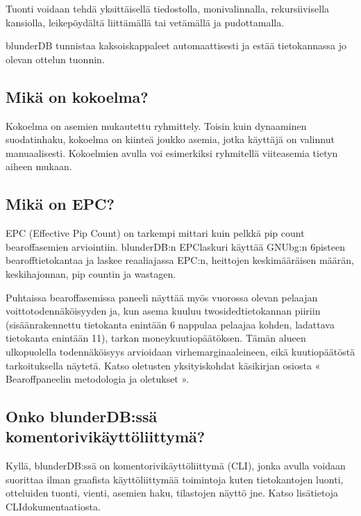 \documentclass[letterpaper,10pt,finnish]{sphinxmanual}
\begin{document}
\sphinxAtStartPar
Tuonti voidaan tehdä yksittäisellä tiedostolla, monivalinnalla, rekursiivisella kansiolla, leikepöydältä liittämällä tai vetämällä ja pudottamalla.

\sphinxAtStartPar
blunderDB tunnistaa kaksoiskappaleet automaattisesti ja estää tietokannassa jo olevan ottelun tuonnin.


\subsection{Mikä on kokoelma?}
\label{\detokenize{faq:qu-est-ce-qu-une-collection}}
\sphinxAtStartPar
Kokoelma on asemien mukautettu ryhmittely. Toisin kuin dynaaminen suodatinhaku, kokoelma on kiinteä joukko asemia, jotka käyttäjä on valinnut manuaalisesti. Kokoelmien avulla voi esimerkiksi ryhmitellä viiteasemia tietyn aiheen mukaan.


\subsection{Mikä on EPC?}
\label{\detokenize{faq:qu-est-ce-que-l-epc}}
\sphinxAtStartPar
EPC (Effective Pip Count) on tarkempi mittari kuin pelkkä pip count bearoff\sphinxhyphen{}asemien arviointiin. blunderDB:n EPC\sphinxhyphen{}laskuri käyttää GNUbg:n 6\sphinxhyphen{}pisteen bearoff\sphinxhyphen{}tietokantaa ja laskee reaaliajassa EPC:n, heittojen keskimääräisen määrän, keskihajonnan, pip countin ja wastagen.

\sphinxAtStartPar
Puhtaissa bearoff\sphinxhyphen{}asemissa paneeli näyttää myös vuorossa olevan pelaajan voittotodennäköisyyden ja, kun asema kuuluu two\sphinxhyphen{}sided\sphinxhyphen{}tietokannan piiriin (sisäänrakennettu tietokanta enintään 6 nappulaa pelaajaa kohden, ladattava tietokanta enintään 11), tarkan money\sphinxhyphen{}kuutiopäätöksen. Tämän alueen ulkopuolella todennäköisyys arvioidaan virhemarginaaleineen, eikä kuutiopäätöstä tarkoituksella näytetä. Katso oletusten yksityiskohdat käsikirjan osiosta « Bearoff\sphinxhyphen{}paneelin metodologia ja oletukset ».


\subsection{Onko blunderDB:ssä komentorivikäyttöliittymä?}
\label{\detokenize{faq:blunderdb-dispose-t-il-d-une-interface-en-ligne-de-commande}}
\sphinxAtStartPar
Kyllä, blunderDB:ssä on komentorivikäyttöliittymä (CLI), jonka avulla voidaan suorittaa ilman graafista käyttöliittymää toimintoja kuten tietokantojen luonti, otteluiden tuonti, vienti, asemien haku, tilastojen näyttö jne. Katso lisätietoja CLI\sphinxhyphen{}dokumentaatiosta.
\end{document}
